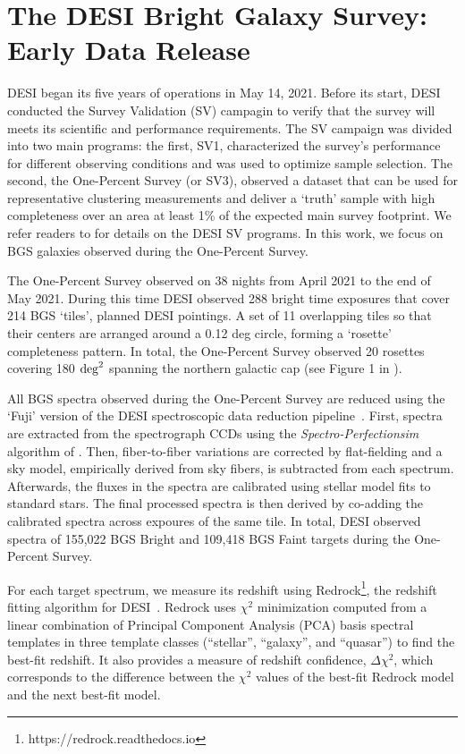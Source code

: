\section{The DESI Bright Galaxy Survey: Early Data Release}  \label{sec:edr}
DESI began its five years of operations in May 14, 2021. 
Before its start, DESI conducted the Survey Validation (SV) campagin to verify
that the survey will meets its scientific and performance requirements. 
The SV campaign was divided into two main programs: the first, SV1,
characterized the survey's performance for different observing conditions and
was used to optimize sample selection. 
The second, the One-Percent Survey (or SV3), observed a dataset that can be
used for representative clustering measurements and deliver a ‘truth’ sample
with high completeness over an area at least 1\% of the expected main survey
footprint.
We refer readers to \cite{sv_paper} for details on the DESI SV programs.
In this work, we focus on BGS galaxies observed during the One-Percent Survey.

The One-Percent Survey observed on 38 nights from April 2021 to the end of 
May 2021.
During this time DESI observed 288 bright time exposures that cover 214 BGS
`tiles', planned DESI pointings. 
A set of 11 overlapping tiles so that their centers are arranged around a 0.12
deg circle, forming a ‘rosette’ completeness pattern. 
In total, the One-Percent Survey observed 20 rosettes covering 180 
${\rm deg}^2$ spanning the northern galactic cap (see Figure 1 in
\citealt{hahn2022}).  


All BGS spectra observed during the One-Percent Survey are reduced using the
`Fuji' version of the DESI spectroscopic data reduction
pipeline~\citep{guy2022}. 
First, spectra are extracted from the spectrograph CCDs using the 
{\em Spectro-Perfectionsim} algorithm of \cite{bolton2010}.
Then, fiber-to-fiber variations are corrected by flat-fielding and a sky model,
empirically derived from sky fibers, is subtracted from each spectrum.
Afterwards, the fluxes in the spectra are calibrated using stellar model fits
to standard stars. 
The final processed spectra is then derived by co-adding the calibrated spectra
across expoures of the same tile. 
In total, DESI observed spectra of 155,022 BGS Bright and 109,418 BGS Faint 
targets during the One-Percent Survey. 

For each target spectrum, we measure its redshift using 
{\sc Redrock}\footnote{https://redrock.readthedocs.io}, the redshift fitting
algorithm for DESI~\citep{bailey2022}. 
{\sc Redrock} uses $\chi^2$ minimization computed from a linear combination of
Principal Component Analysis (PCA) basis spectral templates in three template
classes (``stellar'',  ``galaxy'', and ``quasar'') to find the best-fit
redshift. 
It also provides a measure of redshift confidence, $\Delta\chi^2$, which
corresponds to the difference between the $\chi^2$ values of the best-fit 
{\sc Redrock} model and the next best-fit model.

